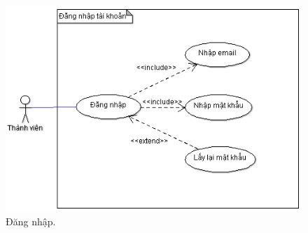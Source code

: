 \documentclass[a4paper,12pt,oneside]{article}
\begin{document}
\begin{figure}[htp]
\centering
\includegraphics[scale=.9]{hinh/login.png}
\caption{Đăng nhập.}
\end{figure}
\end{document}
